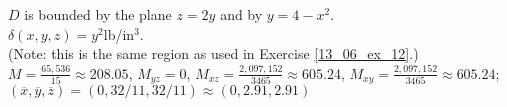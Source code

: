 {$D$ is bounded by the plane $z=2y$ and by $y=4-x^2$.\\
$\delta(x,y,z) = y^2$lb/in$^3$.\\
(Note: this is the same region as used in Exercise \ref{13_06_ex_12}.)
}
{$M = \frac{65,536}{15}\approx 208.05$, $M_{yz} = 0$, $M_{xz}=\frac{2,097,152}{3465}\approx 605.24$, $M_{xy}=\frac{2,097,152}{3465}\approx 605.24$;\\
$(\overline{x},\overline{y},\overline{z}) = (0,32/11,32/11) \approx (0,2.91,2.91)$
}
